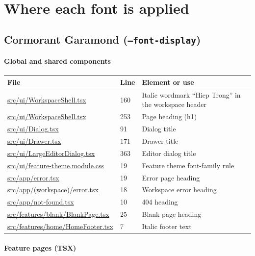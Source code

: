 \documentclass[11pt,a4paper]{article}
\DeclareRobustCommand{\file}[1]{{\ttfamily\small\url{#1}}}
\begin{document}
\section{Where each font is applied}

\subsection{Cormorant Garamond (\texttt{--font-display})}

\paragraph{Global and shared components}

\begin{longtable}{@{}p{5.4cm}p{1.8cm}p{7.6cm}@{}}
\toprule
File & Line & Element or use \\
\midrule
\endhead
\file{src/ui/WorkspaceShell.tsx} & 160 & Italic wordmark ``Hiep Trong'' in the workspace header \\
\file{src/ui/WorkspaceShell.tsx} & 253 & Page heading (h1) \\
\file{src/ui/Dialog.tsx} & 91 & Dialog title \\
\file{src/ui/Drawer.tsx} & 171 & Drawer title \\
\file{src/ui/LargeEditorDialog.tsx} & 363 & Editor dialog title \\
\file{src/ui/feature-theme.module.css} & 19 & Feature theme font-family rule \\
\file{src/app/error.tsx} & 19 & Error page heading \\
\file{src/app/(workspace)/error.tsx} & 18 & Workspace error heading \\
\file{src/app/not-found.tsx} & 10 & 404 heading \\
\file{src/features/blank/BlankPage.tsx} & 25 & Blank page heading \\
\file{src/features/home/HomeFooter.tsx} & 7 & Italic footer text \\
\bottomrule
\end{longtable}

\paragraph{Feature pages (TSX)}
\end{document}
